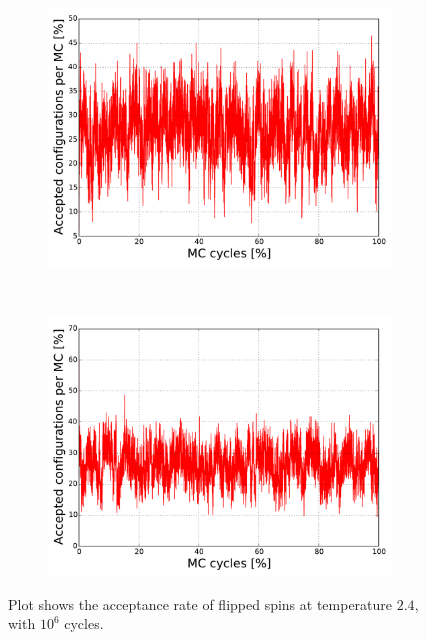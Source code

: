 \begin{figure}[H]
    \centering
    \begin{subfigure}{0.5\textwidth}
        \centering
        \includegraphics[width=\linewidth]{result/bilder/config/energy22-MC1000000T24-configN20}
        \caption{}
    \end{subfigure}%
    ~ 
    \begin{subfigure}{0.5\textwidth}
        \centering
        \includegraphics[width=\linewidth]{result/bilder/config/energy22-MC1000000T24-config-RNGN20}
        \caption{}
    \end{subfigure}
    \caption{Plot shows the acceptance rate of flipped spins at temperature $2.4$, with $10^6$ cycles. }
    \label{fig:config-T24}
\end{figure}

